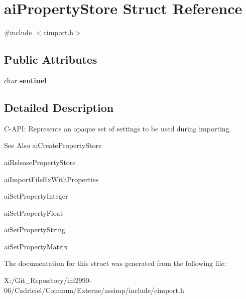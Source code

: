 \hypertarget{structai_property_store}{\section{ai\-Property\-Store Struct Reference}
\label{structai_property_store}
}


{\ttfamily \#include $<$cimport.\-h$>$}

\subsection*{Public Attributes}
\begin{DoxyCompactItemize}
\item 
\hypertarget{structai_property_store_a53e97983bdbe38c596c7879555dc42a3}{char {\bfseries sentinel}}\label{structai_property_store_a53e97983bdbe38c596c7879555dc42a3}

\end{DoxyCompactItemize}


\subsection{Detailed Description}
C-\/\-A\-P\-I\-: Represents an opaque set of settings to be used during importing. \begin{DoxySeeAlso}{See Also}
ai\-Create\-Property\-Store 

ai\-Release\-Property\-Store 

ai\-Import\-File\-Ex\-With\-Properties 

ai\-Set\-Property\-Integer 

ai\-Set\-Property\-Float 

ai\-Set\-Property\-String 

ai\-Set\-Property\-Matrix 
\end{DoxySeeAlso}


The documentation for this struct was generated from the following file\-:\begin{DoxyCompactItemize}
\item 
X\-:/\-Git\-\_\-\-Repository/inf2990-\/06/\-Cadriciel/\-Commun/\-Externe/assimp/include/cimport.\-h\end{DoxyCompactItemize}
